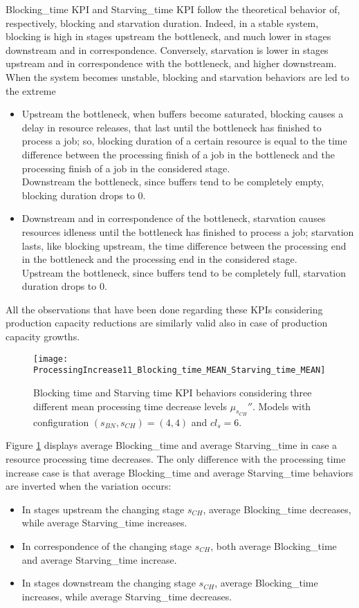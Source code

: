 Blocking\_time KPI and Starving\_time KPI follow the theoretical behavior of, respectively, blocking and starvation duration. Indeed, in a stable system, blocking is high in stages upstream the bottleneck, and much lower in stages downstream and in correspondence. Conversely, starvation is lower in stages upstream and in correspondence with the bottleneck, and higher downstream. When the system becomes unstable, blocking and starvation behaviors are led to the extreme 
\begin{itemize}
\item Upstream the bottleneck, when buffers become saturated, blocking causes a delay in resource releases, that last until the bottleneck has finished to process a job; so, blocking duration of a certain resource is equal to the time difference between the processing finish of a job in the bottleneck and the processing finish of a job in the considered stage. \\Downstream the bottleneck, since buffers tend to be completely empty, blocking duration drops to $0$.
\item Downstream and in correspondence of the bottleneck, starvation causes resources idleness until the bottleneck has finished to process a job; starvation lasts, like blocking upstream, the time difference between the processing end in the bottleneck and the processing end in the considered stage. \\Upstream the bottleneck, since buffers tend to be completely full, starvation duration drops to $0$.
\end{itemize}
All the observations that have been done regarding these KPIs considering production capacity reductions are similarly valid also in case of production capacity growths.
\begin{figure}[h] 
\centering
\texttt{[image: ProcessingIncrease11\_Blocking\_time\_MEAN\_Starving\_time\_MEAN]}
\caption[Blocking time and Starving time KPI behaviors with different processing time decrease levels]{Blocking time and Starving time KPI behaviors considering three different mean processing time decrease levels $\mu_{s_{CH}}''$. Models with configuration $(s_{BN},s_{CH})=(4,4)$ and $cl_s=6$.}
\label{fig:Blocking time and Starving time KPIs behavior with different processing time decrease levels}
\end{figure}
Figure \ref{fig:Blocking time and Starving time KPIs behavior with different processing time decrease levels} displays average Blocking\_time and average Starving\_time in case a resource processing time decreases. The only difference with the processing time increase case is that average Blocking\_time and average Starving\_time behaviors are inverted when the variation occurs:
\begin{itemize}
\item In stages upstream the changing stage $s_{CH}$, average Blocking\_time decreases, while average Starving\_time increases.
\item In correspondence of the changing stage $s_{CH}$, both average Blocking\_time and average Starving\_time increase.
\item In stages downstream the changing stage $s_{CH}$, average Blocking\_time increases, while average Starving\_time decreases.
\end{itemize}
